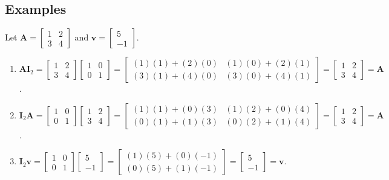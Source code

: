\documentclass{article}
\newcommand{\vect}[1]{\bm{#1}} %
\newcommand{\mat}[1]{\bm{#1}}  %
\begin{document}
\subsection*{Examples}
Let $\mat{A} = \begin{bmatrix} 1 & 2 \\ 3 & 4 \end{bmatrix}$ and $\vect{v} = \begin{bmatrix} 5 \\ -1 \end{bmatrix}$.
\begin{enumerate}
    \item $\mat{A}\mat{I}_2 = \begin{bmatrix} 1 & 2 \\ 3 & 4 \end{bmatrix} \begin{bmatrix} 1 & 0 \\ 0 & 1 \end{bmatrix} = \begin{bmatrix} (1)(1)+(2)(0) & (1)(0)+(2)(1) \\ (3)(1)+(4)(0) & (3)(0)+(4)(1) \end{bmatrix} = \begin{bmatrix} 1 & 2 \\ 3 & 4 \end{bmatrix} = \mat{A}$.
    \item $\mat{I}_2\mat{A} = \begin{bmatrix} 1 & 0 \\ 0 & 1 \end{bmatrix} \begin{bmatrix} 1 & 2 \\ 3 & 4 \end{bmatrix} = \begin{bmatrix} (1)(1)+(0)(3) & (1)(2)+(0)(4) \\ (0)(1)+(1)(3) & (0)(2)+(1)(4) \end{bmatrix} = \begin{bmatrix} 1 & 2 \\ 3 & 4 \end{bmatrix} = \mat{A}$.
    \item $\mat{I}_2\vect{v} = \begin{bmatrix} 1 & 0 \\ 0 & 1 \end{bmatrix} \begin{bmatrix} 5 \\ -1 \end{bmatrix} = \begin{bmatrix} (1)(5)+(0)(-1) \\ (0)(5)+(1)(-1) \end{bmatrix} = \begin{bmatrix} 5 \\ -1 \end{bmatrix} = \vect{v}$.
\end{enumerate}
\end{document}
